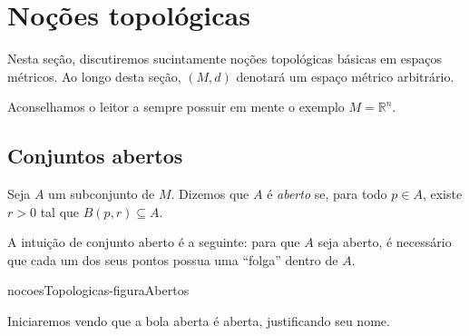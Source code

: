 \section{Noções topológicas}
Nesta seção, discutiremos sucintamente noções topológicas básicas em espaços métricos.
Ao longo desta seção, $(M,d)$ denotará um espaço métrico arbitrário.

Aconselhamos o leitor a sempre possuir em mente o exemplo $M=\mathbb R^n$.

\subsection{Conjuntos abertos}

\begin{definition}
    Seja $A$ um subconjunto de $M$.
    Dizemos que $A$ é \emph{aberto} se, para todo $p\in A$, existe $r>0$ tal que $B(p, r)\subseteq A$.
\end{definition}

A intuição de conjunto aberto é a seguinte: para que $A$ seja aberto, é necessário que cada um dos seus pontos possua uma ``folga'' dentro de $A$.

{nocoesTopologicas-figuraAbertos}

Iniciaremos vendo que a bola aberta é aberta, justificando seu nome.

